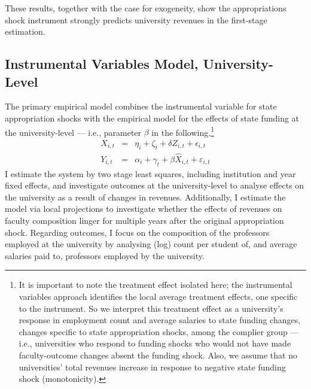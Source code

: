 These results, together with the case for exogeneity, show the appropriations shock instrument strongly predicts university revenues in the first-stage estimation.


\subsection{Instrumental Variables Model, University-Level}
\label{sec:iv-model-uni}

The primary empirical model combines the instrumental variable for state appropriation shocks with the empirical model for the effects of state funding at the university-level --- i.e., parameter $\beta$ in the following.\footnote{
    It is important to note the treatment effect isolated here; the instrumental variables approach identifies the local average treatment effects, one specific to the instrument.
    So we interpret this treatment effect as a university's response in employment count and average salaries to state funding changes, changes specific to state appropriation shocks, among the complier group --- i.e., universities who respond to funding shocks who would not have made faculty-outcome changes absent the funding shock.
    Also, we assume that no universities' total revenues increase in response to negative state funding shock (monotonicity).
}
\begin{eqnarray}
    \label{eqn:secondstage1}
    X_{i,t} &=& \eta_i + \zeta_t + \delta Z_{i,t} + \epsilon_{i,t} \\
    \label{eqn:secondstage2}
    Y_{i,t} &=& \alpha_i + \gamma_t + \beta \widehat X_{i,t} + \varepsilon_{i,t}
\end{eqnarray}
I estimate the system by two stage least squares, including institution and year fixed effects, and investigate outcomes at the university-level to analyse effects on the university as a result of changes in revenues.
Additionally, I estimate the model via local projections \citep{jorda2005,miller2022} to investigate whether the effects of revenues on faculty composition linger for multiple years after the original appropriation shock.
Regarding outcomes, I focus on the composition of the professors employed at the university by analysing (log) count per student of, and average salaries paid to, professors employed by the university.

